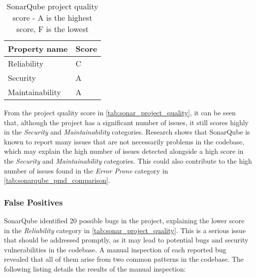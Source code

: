 \begin{table}[H]
  \label{tab:sonar_project_quality}
  \begin{center}
    \begin{tabular}[c]{l|l}
      \hline
      \multicolumn{1}{c|}{\textbf{Property name}} & 
      \multicolumn{1}{c}{\textbf{Score}} \\
      \hline
      Reliability & C \\
      Security & A \\
      Maintainability & A \\
      \hline
    \end{tabular}
  \end{center}
  \caption{SonarQube project quality score - A is the highest score, F is the lowest}
\end{table}

\noindent From the project quality score in \autoref{tab:sonar_project_quality}, it can be seen that, although the project has a significant number of issues, it still scores highly in the \textit{Security} and \textit{Maintainability} categories. Research shows that SonarQube is known to report many issues that are not necessarily problems in the codebase, which may explain the high number of issues detected alongside a high score in the \textit{Security} and \textit{Maintainability} categories. This could also contribute to the high number of issues found in the \textit{Error Prone} category in \autoref{tab:sonarqube_pmd_comparison}.

\subsubsection{False Positives}

SonarQube identified 20 possible bugs in the project, explaining the lower score in the \textit{Reliability} category in \autoref{tab:sonar_project_quality}. This is a serious issue that should be addressed promptly, as it may lead to potential bugs and security vulnerabilities in the codebase. A manual inspection of each reported bug revealed that all of them arise from two common patterns in the codebase. The following listing details the results of the manual inspection:

